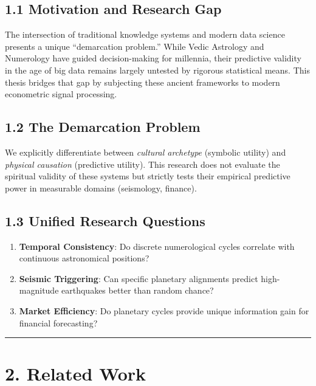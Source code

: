 \documentclass[
  11pt,
  a4paper,
  oneside,
  openany]{report}
\providecommand{\tightlist}{%
  \setlength{\itemsep}{0pt}\setlength{\parskip}{0pt}}\usepackage{longtable,booktabs,array}
\begin{document}
\subsection{1.1 Motivation and Research
Gap}\label{motivation-and-research-gap}

The intersection of traditional knowledge systems and modern data
science presents a unique ``demarcation problem.'' While Vedic Astrology
and Numerology have guided decision-making for millennia, their
predictive validity in the age of big data remains largely untested by
rigorous statistical means. This thesis bridges that gap by subjecting
these ancient frameworks to modern econometric signal processing.

\subsection{1.2 The Demarcation Problem}\label{the-demarcation-problem}

We explicitly differentiate between \emph{cultural archetype} (symbolic
utility) and \emph{physical causation} (predictive utility). This
research does not evaluate the spiritual validity of these systems but
strictly tests their empirical predictive power in measurable domains
(seismology, finance).

\subsection{1.3 Unified Research
Questions}\label{unified-research-questions}

\begin{enumerate}
\def\labelenumi{\arabic{enumi}.}
\tightlist
\item
  \textbf{Temporal Consistency}: Do discrete numerological cycles
  correlate with continuous astronomical positions?
\item
  \textbf{Seismic Triggering}: Can specific planetary alignments predict
  high-magnitude earthquakes better than random chance?
\item
  \textbf{Market Efficiency}: Do planetary cycles provide unique
  information gain for financial forecasting?
\end{enumerate}

\begin{center}\rule{0.5\linewidth}{0.5pt}\end{center}

\section{2. Related Work}\label{related-work}
\end{document}
